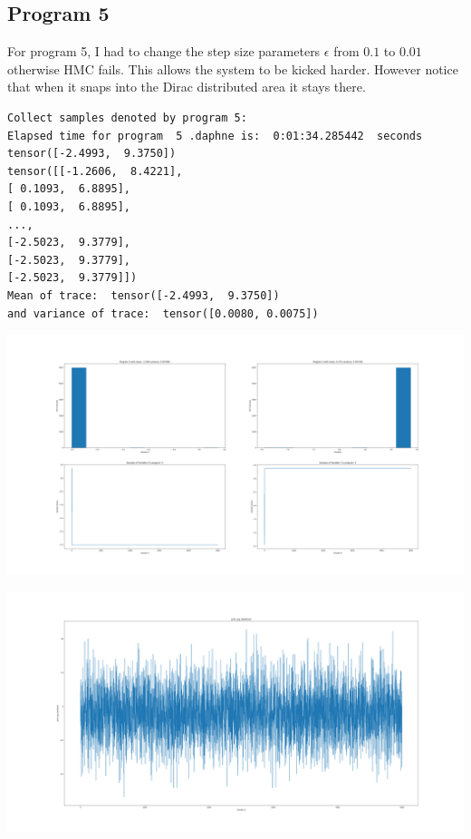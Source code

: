 \documentclass[]{article}
\begin{document}
\subsection{Program 5}
For program 5, I had to change the step size parameters $\epsilon$ from $0.1$ to $0.01$ otherwise HMC fails. This allows the system to be kicked harder. However notice that when it snaps into the Dirac distributed area it stays there.
\begin{verbatim}
Collect samples denoted by program 5:
Elapsed time for program  5 .daphne is:  0:01:34.285442  seconds
tensor([-2.4993,  9.3750])
tensor([[-1.2606,  8.4221],
[ 0.1093,  6.8895],
[ 0.1093,  6.8895],
...,
[-2.5023,  9.3779],
[-2.5023,  9.3779],
[-2.5023,  9.3779]])
Mean of trace:  tensor([-2.4993,  9.3750])  
and variance of trace:  tensor([0.0080, 0.0075])
\end{verbatim}
\begin{center}
	\includegraphics[width=\linewidth]{Figures/p5_HMC.png}
\end{center}
\begin{center}
	\includegraphics[width=\linewidth]{Figures/p5_HMCjll.png}
\end{center}
\end{document}
